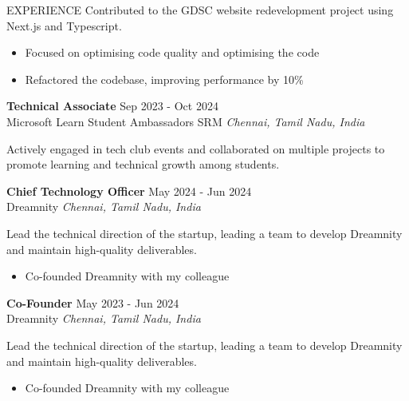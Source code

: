 \documentclass{resume}
\begin{document}
\begin{rSection}{EXPERIENCE}
Contributed to the GDSC website redevelopment project using Next.js and Typescript.

\begin{itemize}
\item Focused on optimising code quality and optimising the code
\item Refactored the codebase, improving performance by 10\%
\end{itemize}
\textbf{Technical Associate} \hfill Sep 2023 - Oct 2024\\
Microsoft Learn Student Ambassadors SRM \hfill \textit{Chennai, Tamil Nadu, India}

Actively engaged in tech club events and collaborated on multiple projects to promote learning and technical growth among students.
\begin{itemize}
\end{itemize}
\textbf{Chief Technology Officer} \hfill May 2024 - Jun 2024\\
Dreamnity \hfill \textit{Chennai, Tamil Nadu, India}

Lead the technical direction of the startup, leading a team to develop Dreamnity and maintain high-quality deliverables.

\begin{itemize}
\item Co-founded Dreamnity with my colleague
\end{itemize}
\textbf{Co-Founder} \hfill May 2023 - Jun 2024\\
Dreamnity \hfill \textit{Chennai, Tamil Nadu, India}

Lead the technical direction of the startup, leading a team to develop Dreamnity and maintain high-quality deliverables.

\begin{itemize}
\item Co-founded Dreamnity with my colleague
\end{itemize}

\end{rSection}

\vspace{1.5em}

\end{document}
